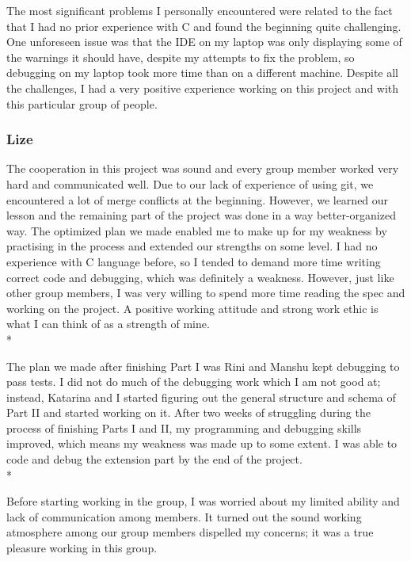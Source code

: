 \documentclass[letterpaper,11pt]{article}
\begin{document}
    \noindent The most significant problems I personally encountered were related to the fact that I had no prior experience with C and found the beginning quite challenging. One unforeseen issue was that the IDE on my laptop was only displaying some of the warnings it should have, despite my attempts to fix the problem, so debugging on my laptop took more time than on a different machine. Despite all the challenges, I had a very positive experience working on this project and with this particular group of people.

    \subsubsection{Lize}
    The cooperation in this project was sound and every group member worked very hard and communicated well. Due to our lack of experience of using git, we encountered a lot of merge conflicts at the beginning. However, we learned our lesson and the remaining part of the project was done in a way better-organized way. The optimized plan we made enabled me to make up for my weakness by practising in the process and extended our strengths on some level. I had no experience with C language before, so I tended to demand more time writing correct code and debugging, which was definitely a weakness. However, just like other group members, I was very willing to spend more time reading the spec and working on the project. A positive working attitude and strong work ethic is what I can think of as a strength of mine. \\*

    \noindent The plan we made after finishing Part I was Rini and Manshu kept debugging to pass tests. I did not do much of the debugging work which I am not good at; instead, Katarina and I started figuring out the general structure and schema of Part II and started working on it. After two weeks of struggling during the process of finishing Parts I and II, my programming and debugging skills improved, which means my weakness was made up to some extent. I was able to code and debug the extension part by the end of the project.\\*

    \noindent Before starting working in the group, I was worried about my limited ability and lack of communication among members. It turned out the sound working atmosphere among our group members dispelled my concerns; it was a true pleasure working in this group.
\end{document}
